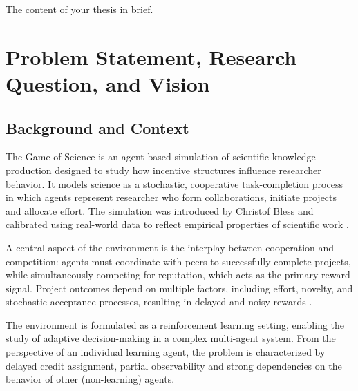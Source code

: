 \documentclass[english,bachelor]{hsluthesis}
\begin{document}
\begin{abstractstyle}{\hsummary}
    The content of your thesis in brief.
\end{abstractstyle}

\tableofcontents
\listoffigures
\listoftables
\printnoidxglossaries



\mainmatter

\chapter{Problem Statement, Research Question, and Vision}

\section{Background and Context}
The Game of Science is an agent-based simulation of scientific knowledge production designed to study how incentive structures influence researcher behavior. It models science as a stochastic, cooperative task-completion process in which agents represent researcher who form collaborations, initiate projects and allocate effort.
The simulation was introduced by Christof Bless and calibrated using real-world data to reflect empirical properties of scientific work \cite{bless_game_of_science_2026}.

A central aspect of the environment is the interplay between cooperation and competition: agents must coordinate with peers to successfully complete projects, while simultaneously competing for reputation, which acts as the primary reward signal. Project outcomes depend on multiple factors, including effort, novelty, and stochastic acceptance processes, resulting in delayed and noisy rewards \cite{bless_game_of_science_2026}.

The environment is formulated as a reinforcement learning setting, enabling the study of adaptive decision-making in a complex multi-agent system. From the perspective of an individual learning agent, the problem is characterized by delayed credit assignment, partial observability and strong dependencies on the behavior of other (non-learning) agents.
\end{document}
